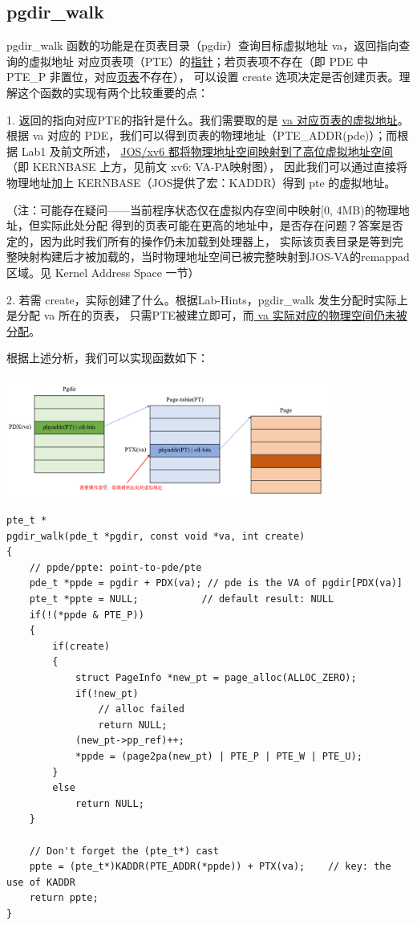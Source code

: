 \documentclass[12pt, letterpaper]{report}
\begin{document}
\subsection{\large pgdir\_walk}
pgdir\_walk 函数的功能是在页表目录（pgdir）查询目标虚拟地址 va，返回指向查询的虚拟地址
对应页表项（PTE）的\underline{指针}；若页表项不存在（即 PDE 中 PTE\_P 非置位，对应\underline{页表}不存在），
可以设置 create 选项决定是否创建页表。理解这个函数的实现有两个比较重要的点：\par 
1. 返回的指向对应PTE的指针是什么。我们需要取的是 \underline{va 对应页表的虚拟地址}。
根据 va 对应的 PDE，我们可以得到页表的物理地址（PTE\_ADDR(pde)）；而根据 Lab1 及前文所述，
\underline{JOS/xv6 都将物理地址空间映射到了高位虚拟地址空间}（即 KERNBASE 上方，见前文 xv6: VA-PA映射图），
因此我们可以通过直接将物理地址加上 KERNBASE（JOS提供了宏：KADDR）得到 pte 的虚拟地址。\par 
\noindent（注：可能存在疑问——当前程序状态仅在虚拟内存空间中映射[0, 4MB)的物理地址，但实际此处分配
得到的页表可能在更高的地址中，是否存在问题？答案是否定的，因为此时我们所有的操作仍未加载到处理器上，
实际该页表目录是等到完整映射构建后才被加载的，当时物理地址空间已被完整映射到JOS-VA的remappad区域。见
Kernel Address Space 一节）\par
2. 若需 create，实际创建了什么。根据Lab-Hints，pgdir\_walk 发生分配时实际上是分配 va 所在的页表，
只需PTE被建立即可，而\underline{ va 实际对应的物理空间仍未被分配}。\par 
根据上述分析，我们可以实现函数如下：\par 
\includegraphics[width=0.8\textwidth]{pgdirwalk}
\lstset{style=CStyle}
\setmainfont{Consolas}
\begin{lstlisting}
pte_t *
pgdir_walk(pde_t *pgdir, const void *va, int create)
{
    // ppde/ppte: point-to-pde/pte
    pde_t *ppde = pgdir + PDX(va); // pde is the VA of pgdir[PDX(va)]
    pte_t *ppte = NULL;			  // default result: NULL
    if(!(*ppde & PTE_P))
    {
        if(create)
        {
            struct PageInfo *new_pt = page_alloc(ALLOC_ZERO);
            if(!new_pt)
                // alloc failed
                return NULL;
            (new_pt->pp_ref)++;
            *ppde = (page2pa(new_pt) | PTE_P | PTE_W | PTE_U);
        }
        else
            return NULL;
    }

    // Don't forget the (pte_t*) cast
    ppte = (pte_t*)KADDR(PTE_ADDR(*ppde)) + PTX(va);	// key: the use of KADDR
    return ppte;
}
\end{lstlisting}
\setmainfont{Times New Roman}
\end{document}
